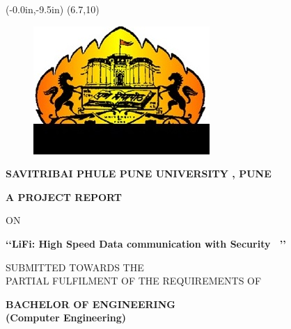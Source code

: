 \documentclass[12pt,a4paper]
{article}
\numberwithin{table}{section}
\begin{document}
\newpage
\pagestyle{empty}
	\thisfancyput(-0.0in,-9.5in){%
\setlength{\unitlength}{1in}\framebox(6.7,10)}

	
	
\begin{center}
	  \begin{figure}[h]
			\centering
			\includegraphics[width=2 cm , height= 2 cm]{Sppu.jpg}
		\end{figure}
	\end{center}	
	\begin{center}
      \textbf{SAVITRIBAI PHULE PUNE UNIVERSITY , PUNE}  
      
\hspace{0.3 in}

      \textbf{A PROJECT REPORT}
      
\hspace{0.1 in}
       ON
			\end{center}
			
	\begin{center}
		\large\bf{\color{red}\textbf{\Large \lq \lq  LiFi: High Speed Data communication with Security \ \rq \rq}}
	\end{center}
     \vspace{0.1 in}
	
		\begin{center}
	    SUBMITTED TOWARDS THE \\
PARTIAL FULFILMENT OF THE REQUIREMENTS OF
	     
	\end{center}
	
	\begin{center}
	   \textbf{BACHELOR OF ENGINEERING
	   \\ (Computer Engineering)}
	\end{center}
	
\end{document}
